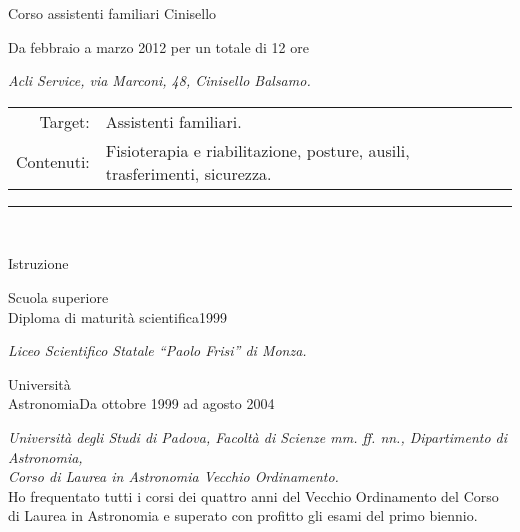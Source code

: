 \documentclass{article}
\makeatletter
\newcommand{\titolo}[1]{\bgroup\rule{\linewidth}{1pt}\\[-14pt]
\null\hfill\fontsize{10pt}{12pt}\sc\selectfont\strut#1\\[21pt]\egroup}
\newcommand{\docenza}[5]{%
{\fontsize{14pt}{17pt}\selectfont\strut#1}\hfill\strut#2\\[-7pt]
\begin{adjustwidth}{28pt}{0pt}
\fontsize{10pt}{12pt}\selectfont\strut\textit{#3}\\
\end{adjustwidth}
\vspace{-3.5pt}
\begin{adjustwidth}{-21pt}{0pt}
\begin{tabular}{@{}r@{\hspace{7pt}}p{\linewidth-56pt}}
\fontsize{10pt}{12pt}\selectfont\strut Target: & #4\\
\fontsize{10pt}{12pt}\selectfont\strut Contenuti: &#5\\[7pt]
\end{tabular}
\end{adjustwidth}
}
\makeatother
\begin{document}
\docenza{Corso assistenti familiari Cinisello}{Da febbraio a marzo 2012 per un totale di 12 ore}{Acli Service, via Marconi, 48, Cinisello Balsamo.}{Assistenti familiari.}{Fisioterapia e riabilitazione, posture, ausili, trasferimenti, sicurezza.}

\newcommand{\paragrafo}[1]{{\fontsize{10pt}{12pt}\selectfont#1}\\[7pt]}

\newcommand{\diploma}[4]{{\fontsize{14pt}{17pt}\selectfont#1}\hfill#2\\
\begin{adjustwidth}{28pt}{28pt}
\it #3\\
\end{adjustwidth}}

\newcommand{\universitaPD}[5]{#1\hfill#2\\#3\\#4\\ #5}

\newcommand{\universitaMIB}[7]{{\fontsize{14pt}{17pt}\selectfont#1}\hfill#2\\
\begin{adjustwidth}{28pt}{28pt}
3: #3\\
4: #4\\
5: #5\\
6: #6\\
7: #7
\end{adjustwidth}}


\newcommand{\universita}[4]{{\fontsize{14pt}{17pt}\selectfont#1}\hfill#2\\
\begin{adjustwidth}{28pt}{28pt}
\textit{#3}\\
#4\\[14pt]
\end{adjustwidth}}

\clearpage
\titolo{Istruzione}

\paragrafo{Scuola superiore}
\diploma{Diploma di maturit\`a scientifica}{1999}{Liceo Scientifico Statale {\em ``Paolo Frisi''} di Monza.}{diploma di maturit\`a scientifica.}

\vspace{21pt}
\paragrafo{Universit\`a}

\universita{Astronomia}{Da ottobre 1999 ad agosto 2004}{Universit\`a degli Studi di Padova, Facolt\`a di Scienze {\sc mm. ff. nn.}, Dipartimento di Astronomia,\\ {Corso di Laurea in Astronomia} Vecchio Ordinamento.}{Ho frequentato tutti i corsi dei quattro anni del Vecchio Ordinamento del Corso di Laurea in Astronomia e superato con profitto gli esami del primo biennio.}
\end{document}
